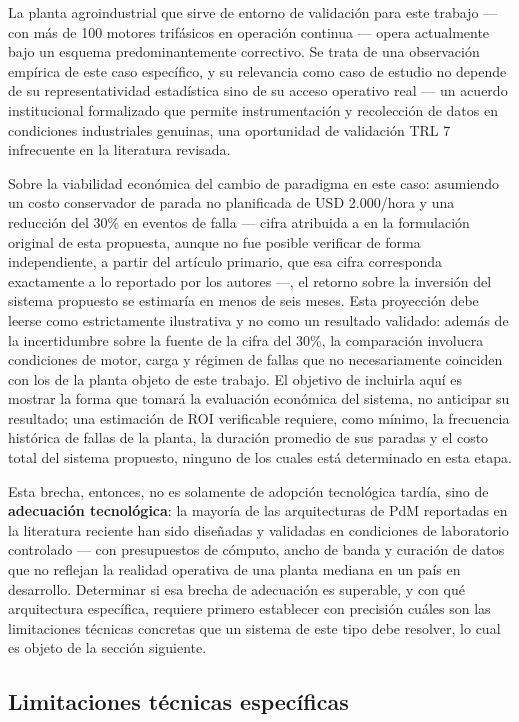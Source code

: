 \documentclass[11pt]{article}
\begin{document}
La planta agroindustrial que sirve de entorno de validación para este trabajo --- con más de 100 motores trifásicos en operación continua --- opera actualmente bajo un esquema predominantemente correctivo. Se trata de una observación empírica de este caso específico, y su relevancia como caso de estudio no depende de su representatividad estadística sino de su acceso operativo real --- un acuerdo institucional formalizado que permite instrumentación y recolección de datos en condiciones industriales genuinas, una oportunidad de validación TRL 7 infrecuente en la literatura revisada.

Sobre la viabilidad económica del cambio de paradigma en este caso: asumiendo un costo conservador de parada no planificada de USD 2.000/hora y una reducción del 30\% en eventos de falla --- cifra atribuida a \citet{abdulkareem2025} en la formulación original de esta propuesta, aunque no fue posible verificar de forma independiente, a partir del artículo primario, que esa cifra corresponda exactamente a lo reportado por los autores ---, el retorno sobre la inversión del sistema propuesto se estimaría en menos de seis meses. Esta proyección debe leerse como estrictamente ilustrativa y no como un resultado validado: además de la incertidumbre sobre la fuente de la cifra del 30\%, la comparación involucra condiciones de motor, carga y régimen de fallas que no necesariamente coinciden con los de la planta objeto de este trabajo. El objetivo de incluirla aquí es mostrar la forma que tomará la evaluación económica del sistema, no anticipar su resultado; una estimación de ROI verificable requiere, como mínimo, la frecuencia histórica de fallas de la planta, la duración promedio de sus paradas y el costo total del sistema propuesto, ninguno de los cuales está determinado en esta etapa.

Esta brecha, entonces, no es solamente de adopción tecnológica tardía, sino de \textbf{adecuación tecnológica}: la mayoría de las arquitecturas de PdM reportadas en la literatura reciente han sido diseñadas y validadas en condiciones de laboratorio controlado --- con presupuestos de cómputo, ancho de banda y curación de datos que no reflejan la realidad operativa de una planta mediana en un país en desarrollo. Determinar si esa brecha de adecuación es superable, y con qué arquitectura específica, requiere primero establecer con precisión cuáles son las limitaciones técnicas concretas que un sistema de este tipo debe resolver, lo cual es objeto de la sección siguiente.

\subsection{Limitaciones técnicas específicas}
\end{document}
